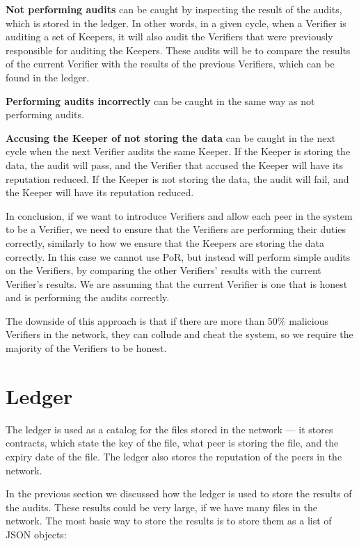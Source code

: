 \textbf{Not performing audits} can be caught by inspecting the result of the audits,
which is stored in the ledger.
In other words, in a given cycle, when a Verifier is auditing a set of Keepers,
it will also audit the Verifiers that were previously responsible for auditing the Keepers.
These audits will be to compare the results of the current Verifier with the results of the previous Verifiers,
which can be found in the ledger.

\textbf{Performing audits incorrectly} can be caught in the same way as not performing audits.

\textbf{Accusing the Keeper of not storing the data} can be caught in the next cycle
when the next Verifier audits the same Keeper.
If the Keeper is storing the data, the audit will pass, and the Verifier that accused the Keeper
will have its reputation reduced.
If the Keeper is not storing the data, the audit will fail, and the Keeper will have its reputation reduced.

In conclusion, if we want to introduce Verifiers and allow each peer in the system to be a Verifier,
we need to ensure that the Verifiers are performing their duties correctly,
similarly to how we ensure that the Keepers are storing the data correctly.
In this case we cannot use PoR, but instead will perform simple audits on the Verifiers,
by comparing the other Verifiers' results with the current Verifier's results.
We are assuming that the current Verifier is one that is honest and is performing the audits correctly.

The downside of this approach is that if there are more than 50\% malicious Verifiers in the network,
they can collude and cheat the system,
so we require the majority of the Verifiers to be honest.

\section{Ledger}

The ledger is used as a catalog for the files stored in the network ---
it stores contracts, which state the key of the file, what peer is storing the file,
and the expiry date of the file.
The ledger also stores the reputation of the peers in the network.

In the previous section we discussed how the ledger is used to store the results of the audits.
These results could be very large, if we have many files in the network.
The most basic way to store the results is to store them as a list of JSON objects:

